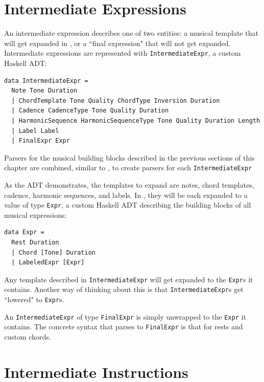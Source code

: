 \documentclass{report}
\begin{document}
\section{Intermediate Expressions}

An intermediate expression describes one of two entities: a musical template that will get expanded in , or a ``final expression" that will not get expanded. Intermediate expressions are represented with \verb.IntermediateExpr., a custom Haskell ADT:

\begin{verbatim}
data IntermediateExpr = 
  Note Tone Duration
  | ChordTemplate Tone Quality ChordType Inversion Duration
  | Cadence CadenceType Tone Quality Duration
  | HarmonicSequence HarmonicSequenceType Tone Quality Duration Length 
  | Label Label
  | FinalExpr Expr
\end{verbatim}

Parsers for the musical building blocks described in the previous sections of this chapter are combined, similar to , to create parsers for each \verb.IntermediateExpr.

As the ADT demonstrates, the templates to expand are notes, chord templates, cadence, harmonic sequences, and labels. In , they will be each expanded to a value of type \verb.Expr., a custom Haskell ADT describing the building blocks of all musical expressions:

\begin{verbatim}
data Expr = 
  Rest Duration
  | Chord [Tone] Duration
  | LabeledExpr [Expr]
\end{verbatim}

Any template described in \verb.IntermediateExpr. will get expanded to the \verb.Expr.s it contains. Another way of thinking about this is that \verb.IntermediateExpr.s get ``lowered" to \verb.Expr.s.

An \verb.IntermediateExpr. of type \verb.FinalExpr. is simply unwrapped to the \verb.Expr. it contains. The concrete syntax that parses to \verb.FinalExpr. is that for rests and custom chords. 

\section{Intermediate Instructions}
\end{document}

